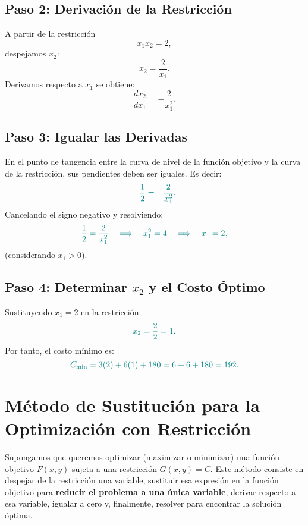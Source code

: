 \documentclass{article}
\begin{document}
\subsection*{Paso 2: Derivación de la Restricción}
A partir de la restricción
\[
x_1 x_2 = 2,
\]
despejamos \(x_2\):
\[
x_2 = \frac{2}{x_1}.
\]
Derivamos respecto a \(x_1\) se obtiene:
\[
\frac{dx_2}{dx_1} = -\frac{2}{x_1^2}.
\]

\subsection*{Paso 3: Igualar las Derivadas}
En el punto de tangencia entre la curva de nivel de la función objetivo y la curva de la restricción, sus pendientes deben ser iguales. Es decir:
\[\color{teal}
-\frac{1}{2} = -\frac{2}{x_1^2}.
\]
Cancelando el signo negativo y resolviendo:
\[\color{teal}
\frac{1}{2} = \frac{2}{x_1^2} \quad\Longrightarrow\quad x_1^2 = 4 \quad\Longrightarrow\quad x_1 = 2,
\]
(considerando \(x_1>0\)).

\subsection*{Paso 4: Determinar \(x_2\) y el Costo Óptimo}
Sustituyendo \(x_1=2\) en la restricción:
\[\color{teal}
x_2 = \frac{2}{2} = 1.
\]
Por tanto, el costo mínimo es:
\[
\color{teal}C_{\min} = 3(2) + 6(1) + 180 = 6 + 6 + 180 = 192.
\]



\section*{Método de Sustitución para la Optimización con Restricción}

Supongamos que queremos optimizar (maximizar o minimizar) una función objetivo \(F(x,y)\) sujeta a una restricción \(G(x,y)=C\). Este método consiste en despejar de la restricción una variable, sustituir esa expresión en la función objetivo para \textbf{\color{teal}reducir el problema a una única variable}, derivar respecto a esa variable, igualar a cero y, finalmente, resolver para encontrar la solución óptima.
\end{document}
